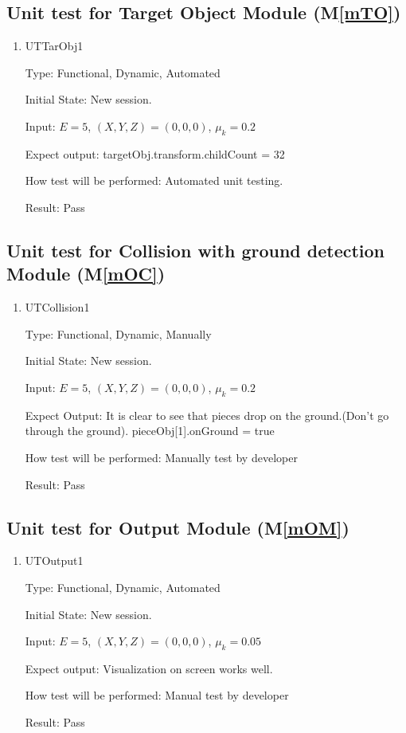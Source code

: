 \documentclass[12pt, titlepage]{article}
\newcommand{\mref}[1]{M\ref{#1}}
\begin{document}
\subsection{Unit test for Target Object Module (\mref{mTO})}
\label{Sec_UmTO}
\begin{enumerate}
	
	\item{UTTarObj1\\}
	
	Type: Functional, Dynamic, Automated
	
	Initial State: New session.
	
	Input: $E = 5$, $(X,Y,Z) = (0,0,0)$, $\mu_{k} = 0.2$
	
	Expect output: targetObj.transform.childCount = 32
	
	How test will be performed: Automated unit testing.
	
	Result: Pass
\end{enumerate}

\subsection{Unit test for Collision with ground detection Module (\mref{mOC})}
\label{Sec_UmOC}
\begin{enumerate}
	
	\item{UTCollision1\\}
	
	Type: Functional, Dynamic, Manually
	
	Initial State: New session.
	
	Input: $E = 5$, $(X,Y,Z) = (0,0,0)$, $\mu_{k} = 0.2$
	
	Expect Output: It is clear to see that pieces drop on the ground.(Don't go through the ground). pieceObj[1].onGround = true
	
	How test will be performed: Manually test by developer
	
	Result: Pass
\end{enumerate}

\subsection{Unit test for Output Module (\mref{mOM})}
\label{Sec_UmOM}
\begin{enumerate}
	
	\item{UTOutput1\\}
	
	Type: Functional, Dynamic, Automated
	
	Initial State: New session.
	
	Input: $E = 5$, $(X,Y,Z) = (0,0,0)$, $\mu_{k} = 0.05$
	
	Expect output: Visualization on screen works well.
	
	How test will be performed: Manual test by developer
	
	Result: Pass
\end{enumerate}
\end{document}
